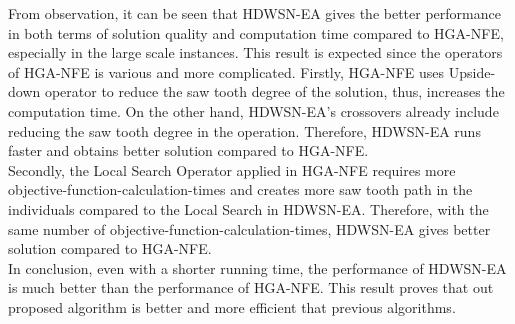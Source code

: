 \documentclass[final]{elsarticle}
\begin{document}
From observation, it can be seen that HDWSN-EA gives the better performance in both terms of solution quality and computation time compared to HGA-NFE, especially in the large scale instances. This result is expected since the operators of HGA-NFE is various and more complicated. Firstly, HGA-NFE uses Upside-down operator to reduce the saw tooth degree of the solution, thus, increases the computation time. On the other hand, HDWSN-EA’s crossovers already include reducing the saw tooth degree in the operation. Therefore, HDWSN-EA runs faster and obtains better solution compared to HGA-NFE. \\
Secondly, the Local Search Operator applied in HGA-NFE requires more objective-function-calculation-times and creates more saw tooth path in the individuals compared to the Local Search in HDWSN-EA. Therefore, with the same number of objective-function-calculation-times, HDWSN-EA gives better solution compared to HGA-NFE.\\
In conclusion, even with a shorter running time, the performance of HDWSN-EA is much better than the performance of HGA-NFE. This result proves that out proposed algorithm is better and more efficient that previous algorithms.
\end{document}
